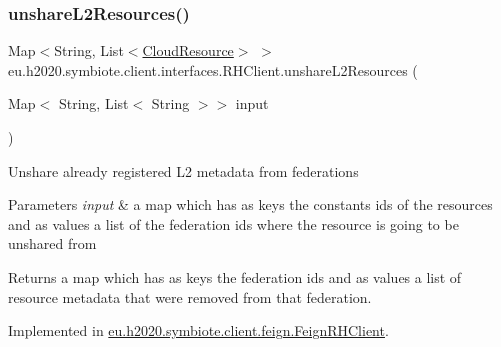 \mbox{\label{interfaceeu_1_1h2020_1_1symbiote_1_1client_1_1interfaces_1_1RHClient_a0570ca0fb6285f0e9900429c93a83de3}} 
\subsubsection{\texorpdfstring{unshare\+L2\+Resources()}{unshareL2Resources()}}
{\footnotesize\ttfamily Map$<$String, List$<$\hyperlink{classeu_1_1h2020_1_1symbiote_1_1cloud_1_1model_1_1internal_1_1CloudResource}{Cloud\+Resource}$>$ $>$ eu.\+h2020.\+symbiote.\+client.\+interfaces.\+R\+H\+Client.\+unshare\+L2\+Resources (\begin{DoxyParamCaption}\item[{Map$<$ String, List$<$ String $>$$>$}]{input }\end{DoxyParamCaption})}

Unshare already registered L2 metadata from federations 
\begin{DoxyParams}{Parameters}
{\em input} & a map which has as keys the constants ids of the resources and as values a list of the federation ids where the resource is going to be unshared from \\
\hline
\end{DoxyParams}
\begin{DoxyReturn}{Returns}
a map which has as keys the federation ids and as values a list of resource metadata that were removed from that federation. 
\end{DoxyReturn}


Implemented in \hyperlink{classeu_1_1h2020_1_1symbiote_1_1client_1_1feign_1_1FeignRHClient_aaac584d86c2d5c63dbfe1a367fc3bd24}{eu.\+h2020.\+symbiote.\+client.\+feign.\+Feign\+R\+H\+Client}.

\mbox{\label{interfaceeu_1_1h2020_1_1symbiote_1_1client_1_1interfaces_1_1RHClient_a4428c0bb91f9433dae6a0ef98a696d11}} 
